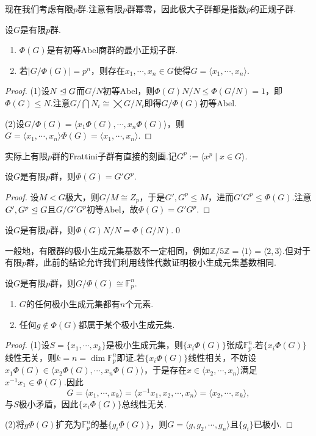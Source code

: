 现在我们考虑有限$p$群.注意有限$p$群幂零，因此极大子群都是指数$p$的正规子群.
\begin{prop}
	设$G$是有限$p$群.
	\begin{enumerate}
		\item $\Phi(G)$是有初等Abel商群的最小正规子群.
		\item 若$|G/\Phi(G)|=p^n$，则存在$x_1,\cdots,x_n\in G$使得$G=\langle x_1,\cdots,x_n\rangle $.
	\end{enumerate}
\end{prop}
\begin{proof}
	\hspace*{5.2pt}(1)设$N\trianglelefteq G$而$G/N$初等Abel，则$\Phi(G)N/N\le\Phi(G/N)=1$，即$\Phi(G)\le N$.注意$G/\bigcap N_i\cong\bigtimes G/N_i$即得$G/\Phi(G)$初等Abel.

	(2)设$G/\Phi(G)=\langle x_1\Phi(G),\cdots,x_n\Phi(G)\rangle $，则$G=\langle x_1,\cdots,x_n\rangle\Phi(G)=\langle x_1,\cdots,x_n\rangle $.
\end{proof}

实际上有限$p$群的Frattini子群有直接的刻画.记$G^p:=\langle x^p\mid x\in G\rangle $.
\begin{prop}
	设$G$是有限$p$群，则$\Phi(G)=G'G^p$.
\end{prop}
\begin{proof}
	设$M<G$极大，则$G/M\cong Z_p$，于是$G',G^p\le M$，进而$G'G^p\le\Phi(G)$.注意$G',G^p\trianglelefteq G$且$G/G'G^p$初等Abel，故$\Phi(G)=G'G^p$.
\end{proof}
\begin{cor}
	设$G$是有限$p$群，则$\Phi(G)N/N=\Phi(G/N)$.\qed
\end{cor}

一般地，有限群的极小生成元集基数不一定相同，例如$\mathbb{Z}/5\mathbb{Z}=\langle 1\rangle=\langle 2,3\rangle 	$.但对于有限$p$群，此前的结论允许我们利用线性代数证明极小生成元集基数相同.
\begin{thm}[(Burnside)]
	设$G$是有限$p$群，则$G/\Phi(G)\cong\mathbb{F}_p^n$.
	\begin{enumerate}
		\item $G$的任何极小生成元集都有$n$个元素.
		\item 任何$g\notin\Phi(G)$都属于某个极小生成元集.
	\end{enumerate}
\end{thm}
\begin{proof}
	\hspace*{5.2pt}(1)设$S=\{x_1,\cdots,x_k\}$是极小生成元集，则$\{x_i\Phi(G)\}$张成$\mathbb{F}_p^n$.若$\{x_i\Phi(G)\}$线性无关，则$k=n=\dim\mathbb{F}_p^n$即证.若$\{x_i\Phi(G)\}$线性相关，不妨设$x_1\Phi(G)\in\langle x_2\Phi(G),\cdots,x_n\Phi(G)\rangle $，于是存在$x\in\langle x_2,\cdots,x_n\rangle $满足$x^{-1}x_1\in\Phi(G)$.因此
	\[
		G=\langle x_1,\cdots,x_k\rangle=\langle x^{-1}x_1,x_2,\cdots,x_n\rangle=\langle x_2,\cdots,x_k\rangle,
	\]
	与$S$极小矛盾，因此$\{x_i\Phi(G)\}$总线性无关.

	(2)将$g\Phi(G)$扩充为$\mathbb{F}_p^n$的基$\{g_i\Phi(G)\}$，则$G=\langle g,g_2,\cdots,g_n\rangle$且$\{g_i\}$已极小.
\end{proof}